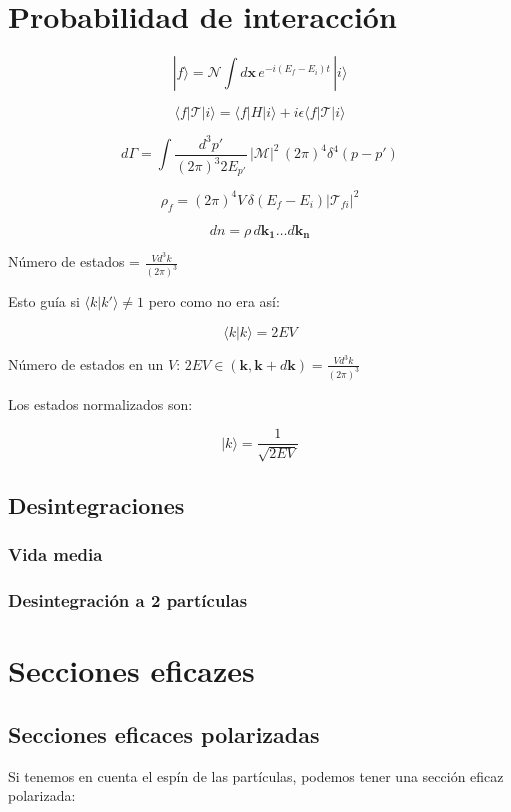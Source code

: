 \section{Probabilidad de interacción}
$$
|f\rangle = \mathcal{N} \int d\mathbf{x} \, e^{-i(E_{f} - E_{i})t} \, |i\rangle
$$

$$
\langle f | \mathcal{T} | i \rangle = \langle f | H | i \rangle + i\epsilon \langle f | \mathcal{T} | i \rangle
$$

$$
d\Gamma = \int \frac{d^3 p'}{(2\pi)^3 2E_{p'}} \, |\mathcal{M}|^2 \, (2\pi)^4 \delta^4(p - p') 
$$

$$
\rho_f = (2\pi)^4 V \, \delta(E_f - E_i) | \mathcal{T}_{fi} |^2
$$

$$
dn = \rho \, d\mathbf{k_1} \ldots d\mathbf{k_n}
$$

Número de estados = $ \frac{V d^3k}{(2\pi)^3} $

Esto guía si $ \langle k | k' \rangle \neq 1 $ pero como no era así:

$$
\langle k | k \rangle = 2EV
$$

Número de estados en un $ V $: $ 2EV \in (\mathbf{k}, \mathbf{k} + d\mathbf{k}) = \frac{V d^3k}{(2\pi)^3} $

Los estados normalizados son:

$$
|k\rangle = \frac{1}{\sqrt{2EV}} 
$$

\subsection{Desintegraciones}

\subsubsection{Vida media}

\subsubsection{Desintegración a 2 partículas}

\section{Secciones eficazes}

\subsection{Secciones eficaces polarizadas}
Si tenemos en cuenta el espín de las partículas, podemos tener una sección eficaz polarizada:

